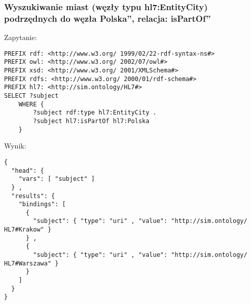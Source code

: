 \subsubsection{Wyszukiwanie miast (węzły typu hl7:EntityCity) podrzędnych do węzła \quotedblbase Polska\textquotedblright, relacja: \quotedblbase isPartOf\textquotedblright }

Zapytanie:
\begin{lstlisting}
PREFIX rdf: <http://www.w3.org/ 1999/02/22-rdf-syntax-ns#>
PREFIX owl: <http://www.w3.org/ 2002/07/owl#>
PREFIX xsd: <http://www.w3.org/ 2001/XMLSchema#>
PREFIX rdfs: <http://www.w3.org/ 2000/01/rdf-schema#>
PREFIX hl7: <http://sim.ontology/HL7#>
SELECT ?subject
	WHERE {      
		?subject rdf:type hl7:EntityCity .
		?subject hl7:isPartOf hl7:Polska
	}
\end{lstlisting}

Wynik:
\begin{lstlisting}
{
  "head": {
    "vars": [ "subject" ]
  } ,
  "results": {
    "bindings": [
      {
        "subject": { "type": "uri" , "value": "http://sim.ontology/ HL7#Krakow" }
      } ,
      {
        "subject": { "type": "uri" , "value": "http://sim.ontology/ HL7#Warszawa" }
      }
    ]
  }
}


\end{lstlisting}
